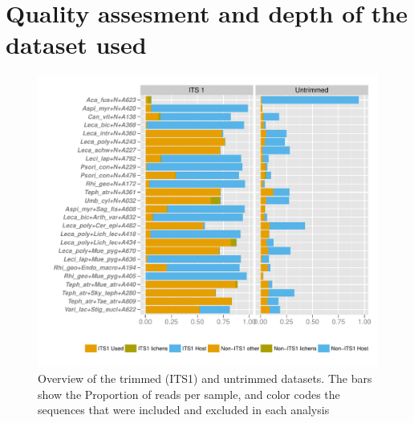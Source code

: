 \documentclass[a4paper, 11]{article}\usepackage[]{graphicx}\usepackage[]{color}
\makeatletter
\def\maxwidth{ %
  \ifdim\Gin@nat@width>\linewidth
    \linewidth
  \else
    \Gin@nat@width
  \fi
}
\newenvironment{kframe}{%
 \def\at@end@of@kframe{}%
 \ifinner\ifhmode%
  \def\at@end@of@kframe{\end{minipage}}%
  \begin{minipage}{\columnwidth}%
 \fi\fi%
 \def\FrameCommand##1{\hskip\@totalleftmargin \hskip-\fboxsep
 \colorbox{shadecolor}{##1}\hskip-\fboxsep
     \hskip-\linewidth \hskip-\@totalleftmargin \hskip\columnwidth}%
 \MakeFramed {\advance\hsize-\width
   \@totalleftmargin\z@ \linewidth\hsize
   \@setminipage}}%
 {\par\unskip\endMakeFramed%
 \at@end@of@kframe}
\newenvironment{knitrout}{}{} %
\makeatother
\begin{document}
\section{Quality assesment and depth of the dataset used}
\begin{knitrout}
\color{fgcolor}\begin{kframe}


{\ttfamily\noindent\itshape\color{messagecolor}{\#\# Loading required package: vegetarian}}\end{kframe}
\end{knitrout}
%
% 
\begin{knitrout}
\color{fgcolor}\begin{figure}[H]
\includegraphics[width=\maxwidth]{figure/2_IntroAllNormalized-1} \caption[Overview of the trimmed (ITS1) and untrimmed datasets]{Overview of the trimmed (ITS1) and untrimmed datasets. The bars show the Proportion of reads per sample, and color codes the sequences that were included and excluded in each analysis}\label{fig:2_IntroAllNormalized}
\end{figure}


\end{knitrout}
\end{document}
